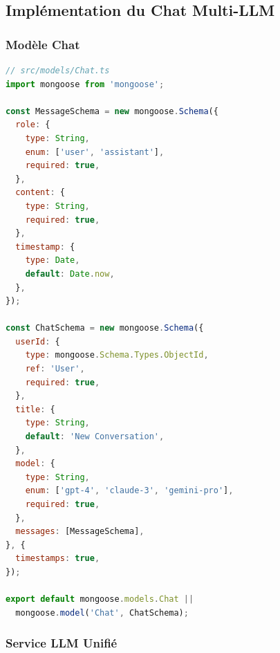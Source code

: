 \subsection{Implémentation du Chat Multi-LLM}

\subsubsection{Modèle Chat}

\begin{lstlisting}[language=JavaScript, caption=Schéma Mongoose Chat, label=code:chat-schema]
// src/models/Chat.ts
import mongoose from 'mongoose';

const MessageSchema = new mongoose.Schema({
  role: {
    type: String,
    enum: ['user', 'assistant'],
    required: true,
  },
  content: {
    type: String,
    required: true,
  },
  timestamp: {
    type: Date,
    default: Date.now,
  },
});

const ChatSchema = new mongoose.Schema({
  userId: {
    type: mongoose.Schema.Types.ObjectId,
    ref: 'User',
    required: true,
  },
  title: {
    type: String,
    default: 'New Conversation',
  },
  model: {
    type: String,
    enum: ['gpt-4', 'claude-3', 'gemini-pro'],
    required: true,
  },
  messages: [MessageSchema],
}, {
  timestamps: true,
});

export default mongoose.models.Chat || 
  mongoose.model('Chat', ChatSchema);
\end{lstlisting}

\subsubsection{Service LLM Unifié}

